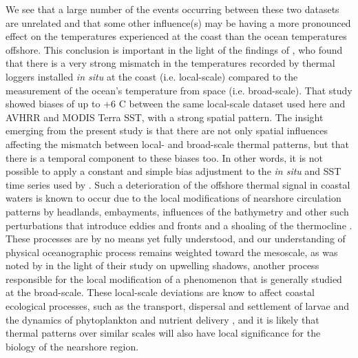 \documentclass[a4paper,10pt,review]{elsarticle}
\begin{document}
We see that a large number of the events occurring between these two datasets are unrelated and that some other influence(s) may be having a more pronounced effect on the temperatures experienced at the coast than the ocean temperatures offshore. This conclusion is important in the light of the findings of \citet{Smit2013}, who found that there is a very strong mismatch in the temperatures recorded by thermal loggers installed \emph{in situ} at the coast (i.e. local-scale) compared to the measurement of the ocean's temperature from space (i.e. broad-scale). That study showed biases of up to +6 \degree C between the same local-scale dataset used here and AVHRR and MODIS Terra SST, with a strong spatial pattern. The insight emerging from the present study is that there are not only spatial influences affecting the mismatch between local- and broad-scale thermal patterns, but that there is a temporal component to these biases too. In other words, it is not possible to apply a constant and simple bias adjustment to the \emph{in situ} and SST time series used by \citet{Smit2013}. Such a deterioration of the offshore thermal signal in coastal waters is known to occur due to the local modifications of nearshore circulation patterns by headlands, embayments, influences of the bathymetry and other such perturbations that introduce eddies and fronts and a shoaling of the thermocline \citep{Okubo1973, Pingree1979, Wolanski1988, Black1990, Grundlingh1991, Graham1997}. These processes are by no means yet fully understood, and our understanding of physical oceanographic process remains weighted toward the mesoscale, as was noted by \citet{Graham1997} in the light of their study on upwelling shadows, another process responsible for the local modification of a phenomenon that is generally studied at the broad-scale. These local-scale deviations are know to affect coastal ecological processes, such as the transport, dispersal and settlement of larvae \citep{Pineda1994, McCulloch2003, Narvaez2004} and the dynamics of phytoplankton and nutrient delivery \citep{Graham1997, Pineda1994}, and it is likely that thermal patterns over similar scales will also have local significance for the biology of the nearshore region.
\end{document}
